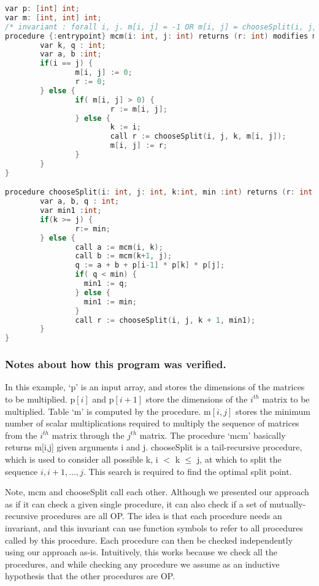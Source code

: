 \begin{lstlisting}[language=c, caption= {Returns the minimum number of multipications needed to multiply a sequence of matrices.}, label=lst:mcm]
var p: [int] int;
var m: [int, int] int;
/* invariant : forall i, j. m[i, j] = -1 OR m[i, j] = chooseSplit(i, j, i, -1) */
procedure {:entrypoint} mcm(i: int, j: int) returns (r: int) modifies m;{
        var k, q : int;
        var a, b :int;
        if(i == j) {
                m[i, j] := 0;
                r := 0;
        } else {
                if( m[i, j] > 0) {
                        r := m[i, j];
                } else {
                        k := i;
                        call r := chooseSplit(i, j, k, m[i, j]);
                        m[i, j] := r;
                }
        }
}

procedure chooseSplit(i: int, j: int, k:int, min :int) returns (r: int) modifies m;{
        var a, b, q : int;
        var min1 :int;
        if(k >= j) {
                r:= min;
        } else {        
                call a := mcm(i, k);
                call b := mcm(k+1, j);
                q := a + b + p[i-1] * p[k] * p[j];
                if( q < min) {
                  min1 := q;
                } else {
                  min1 := min;
                }
                call r := chooseSplit(i, j, k + 1, min1);
        }       
}
\end{lstlisting}

\subsubsection{Notes about how this program was verified.}
In this example, `p' is an input array, and stores the dimensions of the matrices
to be multiplied. p$[i]$ and p$[i+1]$ store the dimensions of the $i^\mathit{th}$
matrix to be multiplied. Table `m' is computed by the procedure. m$[i,j]$
stores the minimum number of scalar multiplications required
to multiply the sequence of matrices from the $i^\mathit{th}$ matrix
through the $j^\mathit{th}$ matrix. The procedure `mcm'
basically returns m[i,j] given arguments i and j. chooseSplit is a
tail-recursive procedure, which is used to consider all possible k, i $<$ k
$\leq$ j, at which to split the sequence $i, i+1, \ldots, j$. This search
is required to find the optimal split point.

Note, mcm and chooseSplit call each other. Although we presented our
approach as if it can check a given single procedure, it can also check if
a set of mutually-recursive procedures are all OP. The idea is that each
procedure needs an invariant, and this invariant can use function symbols
to refer to all procedures called by this procedure. Each procedure can
then be checked independently using our approach as-is. Intuitively, this
works because we check all the procedures, and while checking any procedure
we assume as an inductive hypothesis that the other procedures are OP.

